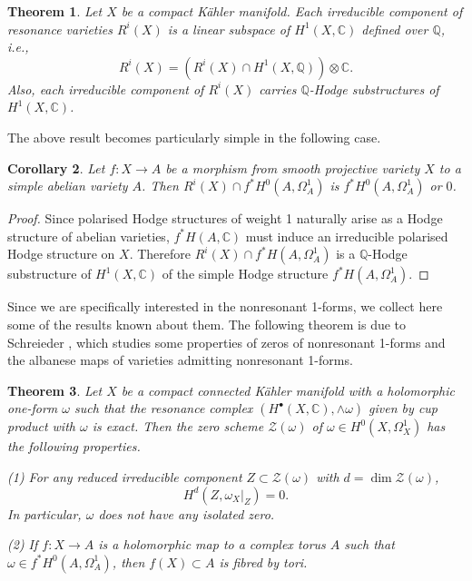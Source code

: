 \documentclass[a4paper,12pt,reqno]{amsart}
\newtheorem{theorem}{Theorem}[section]
\theoremstyle{plain}
\newtheorem{corollary}[theorem]{Corollary}
\theoremstyle{definition}
\theoremstyle{remark}
\newcommand{\Q}{\mathbb Q}
\newcommand{\C}{\mathbb C}
\newcommand{\sZ}{\mathcal{Z}}
\newcommand{\bbC}{\mathbb{C}}
\begin{document}
\begin{theorem}{\cite[Theorem C, Corollary 1.7]{DiPa13}}\label{thm: resonant}
Let $X$ be a compact K\"ahler manifold. Each irreducible component of resonance varieties $R^i(X)$ is a linear subspace of $H^1(X, \C)$ defined over $\Q$, i.e., $$R^i(X)=(R^i(X)\cap H^1(X, \Q))\otimes\C.$$ Also,  each irreducible component of $R^i(X)$ carries $\Q$-Hodge substructures of $H^1(X, \C)$.
\end{theorem} 

The above result becomes particularly simple in the following case.
\begin{corollary}
Let $f:X\to A$ be a morphism from smooth projective variety $X$ to a simple abelian  variety $A$. Then $R^i(X)\cap f^*H^0(A, \Omega_A^1)$ is $f^*H^0(A, \Omega_A^1)$ or $0$.
\end{corollary}

\begin{proof}
Since polarised Hodge structures of weight 1 naturally arise as a Hodge structure of abelian varieties, $f^*H(A, \bbC)$ must induce an irreducible polarised Hodge structure on $X$. Therefore $R^i(X)\cap f^*H(A, \Omega_A^1)$ is a $\Q$-Hodge substructure of $H^1(X, \C)$ of the simple Hodge structure $f^*H(A, \Omega_A^1)$.
\end{proof}




Since we are specifically interested in the nonresonant 1-forms, we collect here some of the results known about them. The following theorem is due to Schreieder \cite{SS19}, which studies some properties of zeros of nonresonant 1-forms and the albanese maps of varieties admitting nonresonant 1-forms.

\begin{theorem} \label{thm:stefan}
Let $X$ be a compact connected K\"ahler manifold with a holomorphic one-form $\omega$ such that the 
resonance complex $(H^{\bullet}(X, \C), \wedge\omega)$ given by cup product with $\omega$ is exact. Then
the zero scheme $\sZ(\omega)$ of $\omega\in H^0(X,\Omega_X^1)$ has the following properties.

(1) For any reduced irreducible component $Z \subset \sZ(\omega)$ with $d=\dim \sZ(\omega)$, $$H^d(Z, \omega_X|_Z)=0.$$
In particular, $\omega$ does not have any isolated zero.

(2) If $f : X \to A$ is a holomorphic map to a complex torus $A$ such that $\omega \in f^*H^0(A, \Omega^1_A)$,
then $f(X)\subset A$ is fibred by tori.
\end{theorem}
\end{document}
